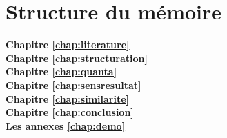 \section{Structure du mémoire}
\label{sec:intro:organisation}

\textbf{Chapitre \ref{chap:literature}} \\[0.2em]

\textbf{Chapitre \ref{chap:structuration}} \\[0.2em]

\textbf{Chapitre \ref{chap:quanta}} \\[0.2em]

\textbf{Chapitre \ref{chap:sensresultat}} \\[0.2em]

\textbf{Chapitre \ref{chap:similarite}} \\[0.2em]

\textbf{Chapitre \ref{chap:conclusion}} \\[0.2em]

\textbf{Les annexes \ref{chap:demo}} \\[0.2em]
